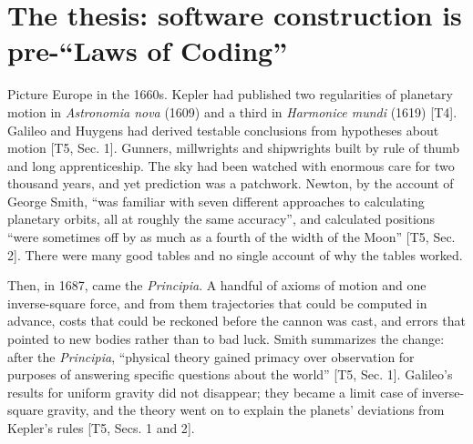 \documentclass[10pt,letterpaper]{article}
\begin{document}
\section{The thesis: software construction is pre-``Laws of
Coding''}\label{the-thesis-software-construction-is-pre-laws-of-coding}

Picture Europe in the 1660s. Kepler had published two regularities of
planetary motion in \emph{Astronomia nova} (1609) and a third in
\emph{Harmonice mundi} (1619) {[}T4{]}. Galileo and Huygens had derived
testable conclusions from hypotheses about motion {[}T5, Sec. 1{]}.
Gunners, millwrights and shipwrights built by rule of thumb and long
apprenticeship. The sky had been watched with enormous care for two
thousand years, and yet prediction was a patchwork. Newton, by the
account of George Smith, ``was familiar with seven different approaches
to calculating planetary orbits, all at roughly the same accuracy'', and
calculated positions ``were sometimes off by as much as a fourth of the
width of the Moon'' {[}T5, Sec. 2{]}. There were many good tables and no
single account of why the tables worked.

Then, in 1687, came the \emph{Principia}. A handful of axioms of motion
and one inverse-square force, and from them trajectories that could be
computed in advance, costs that could be reckoned before the cannon was
cast, and errors that pointed to new bodies rather than to bad luck.
Smith summarizes the change: after the \emph{Principia}, ``physical
theory gained primacy over observation for purposes of answering
specific questions about the world'' {[}T5, Sec. 1{]}. Galileo's results
for uniform gravity did not disappear; they became a limit case of
inverse-square gravity, and the theory went on to explain the planets'
deviations from Kepler's rules {[}T5, Secs. 1 and 2{]}.
\end{document}
